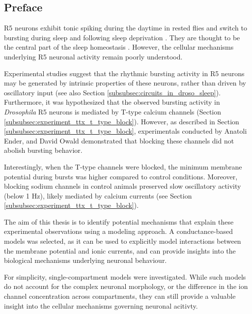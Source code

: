 \documentclass[../main.tex]{subfiles}
\begin{document}
\subsection{Preface} \label{subsec:results_preface}

R5 neurons exhibit tonic spiking during the daytime in rested flies and switch to bursting during sleep and following sleep deprivation \parencite{liuSleepDriveEncoded2016,raccugliaCoherentMultilevelNetwork2022,raccugliaNetworkSpecificSynchronizationElectrical2019}. They are thought to be the central part of the sleep homeostasis \parencite{liuSleepDriveEncoded2016}.
However, the cellular mechanisms underlying R5 neuronal activity remain poorly understood.

Experimental studies suggest that the rhythmic bursting activity in R5 neurons may be generated by intrinsic properties of these neurons, rather than driven by oscillatory input \parencite{raccugliaNetworkSpecificSynchronizationElectrical2019} (see also Section \ref{subsubsec:circuits_in_droso_sleep}).
Furthermore, it was hypothesized that the observed bursting activity in \textit{Drosophila} R5 neurons is mediated by T-type calcium channels (Section \ref{subsubsec:experiment_ttx_t_type_block}). However, as described in Section \ref{subsubsec:experiment_ttx_t_type_block}, experimentals conducted by Anatoli Ender, and David Owald demonstrated that blocking these channels did not abolish bursting behavior.

Interestingly, when the T-type channels were blocked, the minimum membrane potential during bursts was higher compared to control conditions. Moreover, blocking sodium channels in control animals preserved slow oscillatory activity (below 1 Hz), likely mediated by calcium currents (see Section \ref{subsubsec:experiment_ttx_t_type_block}).

The aim of this thesis is to identify potential mechanisms that explain these experimental observations using a modeling approach. A conductance-based models was selected, as it can be used to explicitly model interactions between the membrane potential and ionic currents, and can provide insights into the biological mechanisms underlying neuronal behaviour.

For simplicity, single-compartment models were investigated. While such models do not account for the complex neuronal morphology, or the difference in the ion channel concentration across compartments, they can still provide a valuable insight into the cellular mechanisms governing neuronal acitivty.
\end{document}
